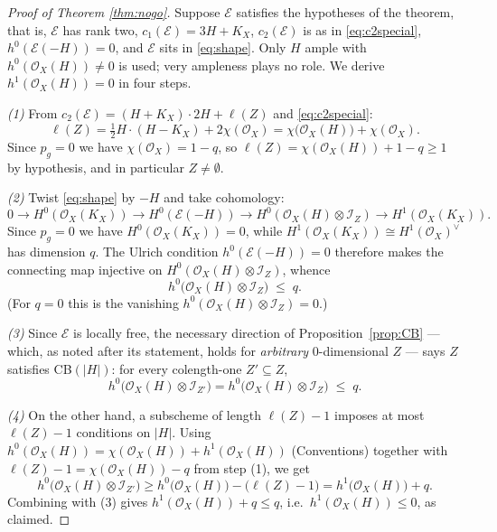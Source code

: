 \documentclass{amsart}
\theoremstyle{definition}
\newcommand{\OO}{\mathcal{O}}
\newcommand{\EE}{\mathcal{E}}
\newcommand{\II}{\mathcal{I}}
\newcommand{\len}{\ell}
\begin{document}
\begin{proof}[Proof of Theorem \textup{\ref{thm:nogo}}]
Suppose $\EE$ satisfies the hypotheses of the theorem, that is, $\EE$ has rank two, $c_1(\EE)=3H+K_X$, $c_2(\EE)$ is as in \eqref{eq:c2special}, $h^0(\EE(-H))=0$, and $\EE$ sits in \eqref{eq:shape}. Only $H$ ample with $h^0(\OO_X(H))\neq0$ is used; very ampleness plays no role. We derive $h^1(\OO_X(H))=0$ in four steps.

\emph{(1)} From $c_2(\EE)=(H+K_X)\cdot 2H+\len(Z)$ and \eqref{eq:c2special}:
\[
\len(Z)=\tfrac12H\cdot(H-K_X)+2\chi(\OO_X)=\chi\bigl(\OO_X(H)\bigr)+\chi(\OO_X) .
\]
Since $p_g=0$ we have $\chi(\OO_X)=1-q$, so $\len(Z)=\chi(\OO_X(H))+1-q\ge1$ by hypothesis, and in particular $Z\neq\emptyset$.

\emph{(2)} Twist \eqref{eq:shape} by $-H$ and take cohomology:
\[
0\to H^0(\OO_X(K_X))\to H^0(\EE(-H))\to H^0(\OO_X(H)\otimes\II_Z)\to H^1(\OO_X(K_X)).
\]
Since $p_g=0$ we have $H^0(\OO_X(K_X))=0$, while $H^1(\OO_X(K_X))\cong H^1(\OO_X)^\vee$ has dimension $q$. The Ulrich condition $h^0(\EE(-H))=0$ therefore makes the connecting map injective on $H^0(\OO_X(H)\otimes\II_Z)$, whence
\[
h^0\bigl(\OO_X(H)\otimes\II_Z\bigr)\;\le\;q .
\]
(For $q=0$ this is the vanishing $h^0(\OO_X(H)\otimes\II_Z)=0$.)

\emph{(3)} Since $\EE$ is locally free, the necessary direction of Proposition~\ref{prop:CB} --- which, as noted after its statement, holds for \emph{arbitrary} $0$-dimensional $Z$ --- says $Z$ satisfies CB$(|H|)$: for every colength-one $Z'\subseteq Z$,
\[
h^0\bigl(\OO_X(H)\otimes\II_{Z'}\bigr)=h^0\bigl(\OO_X(H)\otimes\II_{Z}\bigr)\;\le\;q .
\]

\emph{(4)} On the other hand, a subscheme of length $\len(Z)-1$ imposes at most $\len(Z)-1$ conditions on $|H|$. Using $h^0(\OO_X(H))=\chi(\OO_X(H))+h^1(\OO_X(H))$ (Conventions) together with $\len(Z)-1=\chi(\OO_X(H))-q$ from step (1), we get
\[
h^0\bigl(\OO_X(H)\otimes\II_{Z'}\bigr)\ge h^0\bigl(\OO_X(H)\bigr)-\bigl(\len(Z)-1\bigr)=h^1\bigl(\OO_X(H)\bigr)+q .
\]
Combining with (3) gives $h^1(\OO_X(H))+q\le q$, i.e.\ $h^1(\OO_X(H))\le0$, as claimed.
\end{proof}
\end{document}
